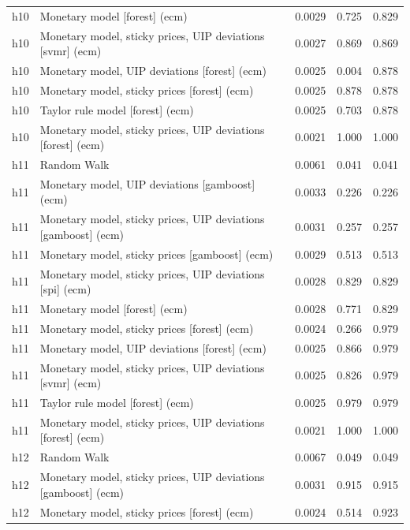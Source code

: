 \begin{ThreePartTable}
\begin{longtable}[t]{cp{5.5cm}ccc}
h10 & \raggedright Monetary model [forest] (ecm) & 0.0029 & 0.725 & 0.829\\
h10 & \raggedright Monetary model, sticky prices, UIP deviations [svmr] (ecm) & 0.0027 & 0.869 & 0.869\\
h10 & \raggedright Monetary model, UIP deviations [forest] (ecm) & 0.0025 & 0.004 & 0.878\\
h10 & \raggedright Monetary model, sticky prices [forest] (ecm) & 0.0025 & 0.878 & 0.878\\
h10 & \raggedright Taylor rule model [forest] (ecm) & 0.0025 & 0.703 & 0.878\\
h10 & \raggedright Monetary model, sticky prices, UIP deviations [forest] (ecm) & 0.0021 & 1.000 & 1.000\\
\addlinespace
h11 & \raggedright Random Walk & 0.0061 & 0.041 & 0.041\\
h11 & \raggedright Monetary model, UIP deviations [gamboost] (ecm) & 0.0033 & 0.226 & 0.226\\
h11 & \raggedright Monetary model, sticky prices, UIP deviations [gamboost] (ecm) & 0.0031 & 0.257 & 0.257\\
h11 & \raggedright Monetary model, sticky prices [gamboost] (ecm) & 0.0029 & 0.513 & 0.513\\
h11 & \raggedright Monetary model, sticky prices, UIP deviations [spi] (ecm) & 0.0028 & 0.829 & 0.829\\
h11 & \raggedright Monetary model [forest] (ecm) & 0.0028 & 0.771 & 0.829\\
h11 & \raggedright Monetary model, sticky prices [forest] (ecm) & 0.0024 & 0.266 & 0.979\\
h11 & \raggedright Monetary model, UIP deviations [forest] (ecm) & 0.0025 & 0.866 & 0.979\\
h11 & \raggedright Monetary model, sticky prices, UIP deviations [svmr] (ecm) & 0.0025 & 0.826 & 0.979\\
h11 & \raggedright Taylor rule model [forest] (ecm) & 0.0025 & 0.979 & 0.979\\
h11 & \raggedright Monetary model, sticky prices, UIP deviations [forest] (ecm) & 0.0021 & 1.000 & 1.000\\
\addlinespace
h12 & \raggedright Random Walk & 0.0067 & 0.049 & 0.049\\
h12 & \raggedright Monetary model, sticky prices, UIP deviations [gamboost] (ecm) & 0.0031 & 0.915 & 0.915\\
h12 & \raggedright Monetary model, sticky prices [forest] (ecm) & 0.0024 & 0.514 & 0.923\\

\end{longtable}
\end{ThreePartTable}
